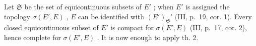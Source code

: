 Let \(\mathfrak{S}\) be the set of equicontinuous subsets of \(E'\) ; when \(E'\) is assigned the topology \(\sigma(E', E)\) , \(E\) can be identified with \((E')_{\mathfrak{S}}'\) (III, p.~19, cor. 1). Every closed equicontinuous subset of \(E'\) is compact for \(\sigma(E', E)\) (III, p.~17, cor. 2), hence complete for \(\sigma(E', E)\) . It is now enough to apply th. 2.

